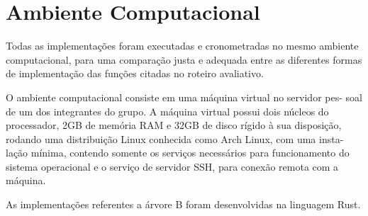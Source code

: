 \section{Ambiente Computacional}

Todas as implementações foram executadas e cronometradas no 
mesmo ambiente computacional, para uma comparação justa e 
adequada entre as diferentes formas de implementação das 
funções citadas no roteiro avaliativo.

O ambiente computacional consiste em uma máquina virtual no servidor pes-
soal de um dos integrantes do grupo. A máquina virtual possui dois núcleos do
processador, 2GB de memória RAM e 32GB de disco rígido à sua disposição,
rodando uma distribuição Linux conhecida como Arch Linux, com uma insta-
lação mínima, contendo somente os serviços necessários para funcionamento do
sistema operacional e o serviço de servidor SSH, para conexão remota com a
máquina.

As implementações referentes a árvore B foram desenvolvidas na linguagem Rust.

